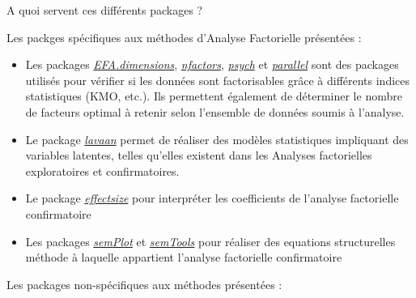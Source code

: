 \documentclass[
  french,
  11pt,
  a4paper,
]{article}
\begin{document}
A quoi servent ces différents packages ?

Les packges spécifiques aux méthodes d'Analyse Factorielle présentées :

\begin{itemize}
\item
  Les packages
  \emph{\href{https://cran.r-project.org/web/packages/EFA.dimensions/index.html}{EFA.dimensions}},
  \emph{\href{https://cran.r-project.org/web/packages/nFactors/index.html}{nfactors}},
  \emph{\href{https://cran.r-project.org/web/packages/psych/index.html}{psych}}
  et
  \emph{\href{https://stat.ethz.ch/R-manual/R-devel/library/parallel/doc/parallel.pdf}{parallel}}
  sont des packages utilisés pour vérifier si les données sont
  factorisables grâce à différents indices statistiques (KMO, etc.). Ils
  permettent également de déterminer le nombre de facteurs optimal à
  retenir selon l'ensemble de données soumis à l'analyse.
\item
  Le package \emph{\href{https://lavaan.ugent.be/}{lavaan}} permet de
  réaliser des modèles statistiques impliquant des variables latentes,
  telles qu'elles existent dans les Analyses factorielles exploratoires
  et confirmatoires.
\item
  Le package
  \emph{\href{https://cran.r-project.org/web/packages/effectsize/index.html}{effectsize}}
  pour interpréter les coefficients de l'analyse factorielle
  confirmatoire
\item
  Les packages
  \emph{\href{https://cran.r-project.org/web/packages/semPlot/index.html}{semPlot}}
  et
  \emph{\href{https://cran.r-project.org/web/packages/semTools/index.html}{semTools}}
  pour réaliser des equations structurelles méthode à laquelle
  appartient l'analyse factorielle confirmatoire
\end{itemize}

Les packages non-spécifiques aux méthodes présentées :
\end{document}
